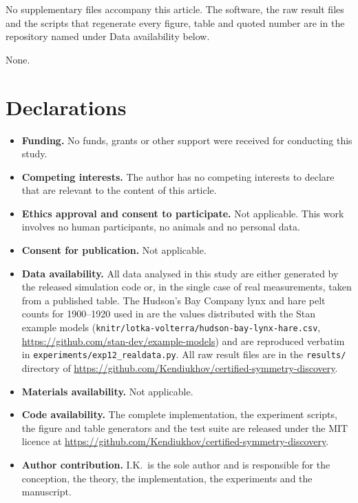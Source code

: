 \documentclass[sn-apa,lineno]{sn-jnl}
\theoremstyle{plain}
\theoremstyle{definition}
\begin{document}

No supplementary files accompany this article. The software, the raw result
files and the scripts that regenerate every figure, table and quoted number are
in the repository named under Data availability below.


None.

\section*{Declarations}

\begin{itemize}
\item \textbf{Funding.} %
  No funds, grants or other support were received for conducting this study.
\item \textbf{Competing interests.} %
  The author has no competing interests to declare that are relevant to the
  content of this article.
\item \textbf{Ethics approval and consent to participate.} Not applicable. This
  work involves no human participants, no animals and no personal data.
\item \textbf{Consent for publication.} Not applicable.
\item \textbf{Data availability.} All data analysed in this study are either
  generated by the released simulation code or, in the single case of real
  measurements, taken from a published table. The Hudson's Bay Company lynx and
  hare pelt counts for 1900--1920 used in  are the values
  distributed with the Stan example models
  (\texttt{knitr/lotka-volterra/hudson-bay-lynx-hare.csv},
  \url{https://github.com/stan-dev/example-models}) and are reproduced verbatim
  in \texttt{experiments/exp12\_realdata.py}. All raw result files are in the
  \texttt{results/} directory of
  \url{https://github.com/Kendiukhov/certified-symmetry-discovery}.
\item \textbf{Materials availability.} Not applicable.
\item \textbf{Code availability.} The complete implementation, the experiment
  scripts, the figure and table generators and the test suite are released
  under the MIT licence at
  \url{https://github.com/Kendiukhov/certified-symmetry-discovery}.
\item \textbf{Author contribution.} I.K.\ is the sole author and is responsible
  for the conception, the theory, the implementation, the experiments and the
  manuscript.
\end{itemize}

\begin{appendices}

\end{appendices}


\end{document}
